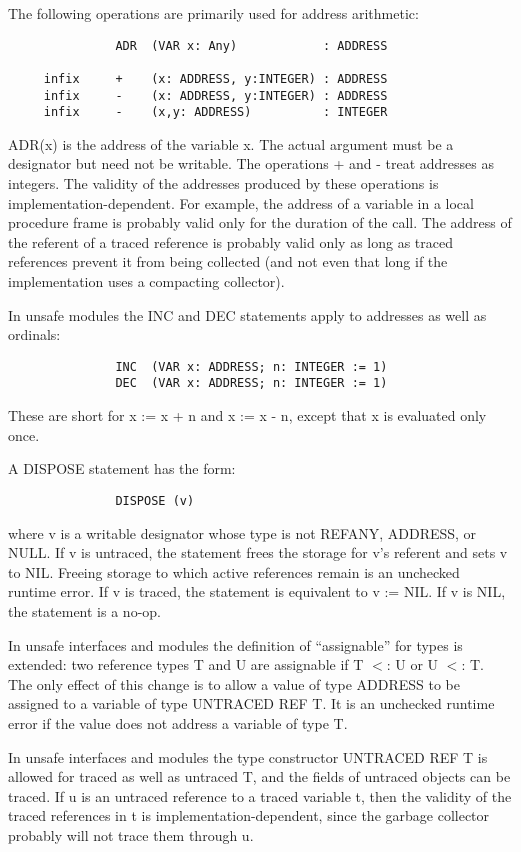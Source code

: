 \documentclass[10pt]{article}
\begin{document}
The following operations are primarily used for address arithmetic:
\begin{verbatim}
               ADR  (VAR x: Any)            : ADDRESS

     infix     +    (x: ADDRESS, y:INTEGER) : ADDRESS
     infix     -    (x: ADDRESS, y:INTEGER) : ADDRESS
     infix     -    (x,y: ADDRESS)          : INTEGER
\end{verbatim}
ADR(x) is the address of the variable x.  The actual argument must be a
designator but need not be writable.  The operations + and - treat addresses as
integers.  The validity of the addresses produced by these operations is
implementation-dependent.  For example, the address of a variable in a local
procedure frame is probably valid only for the duration of the call.  The
address of the referent of a traced reference is probably valid only as long
as traced references prevent it from being collected (and not even that long
if the implementation uses a compacting collector).

In unsafe modules the INC and DEC statements apply to addresses as well as
ordinals:
\begin{verbatim}
               INC  (VAR x: ADDRESS; n: INTEGER := 1)
               DEC  (VAR x: ADDRESS; n: INTEGER := 1)
\end{verbatim}
These are short for x := x + n and x := x - n, except that x is evaluated only
once.

A DISPOSE statement has the form:
\begin{verbatim}
               DISPOSE (v)
\end{verbatim}
where v is a writable designator whose type is not REFANY, ADDRESS, or
NULL.  If v is untraced, the statement frees the storage for v's referent and
sets v to NIL.  Freeing storage to which active references remain is an
unchecked runtime error.  If v is traced, the statement is equivalent to v :=
NIL.  If v is NIL, the statement is a no-op.

In unsafe interfaces and modules the definition of ``assignable'' for types is
extended: two reference types T and U are assignable if T $<$: U or U $<$:
T.  The only effect of this change is to allow a value of type ADDRESS to be
assigned to a variable of type UNTRACED REF T.  It is an unchecked runtime
error if the value does not address a variable of type T.

In unsafe interfaces and modules the type constructor UNTRACED REF T is
allowed for traced as well as untraced T, and the fields of untraced objects
can be traced.  If u is an untraced reference to a traced variable t, then the
validity of the traced references in t is implementation-dependent, since the
garbage collector probably will not trace them through u.
\end{document}
